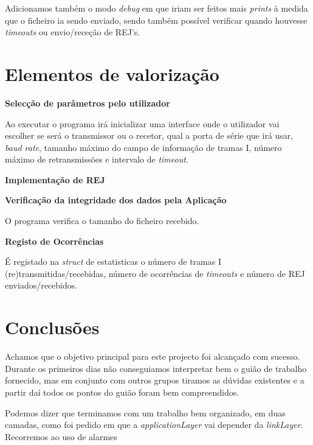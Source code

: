 \documentclass[11pt]{article}
\begin{document}
\par Adicionamos também o modo \textit{debug} em que iriam ser feitos mais \textit{prints} à medida que o ficheiro ia sendo enviado, sendo também possível verificar quando houvesse \textit{timeouts} ou envio/receção de REJ's. 






\newpage
\section{ Elementos de valorização}

\textbf{Selecção de parâmetros pelo utilizador}
\par Ao executar o programa irá inicializar uma interface onde o utilizador vai escolher se será o transmissor ou o recetor, qual a porta de série que irá usar, \textit{baud rate}, tamanho máximo do campo de informação de tramas I, número máximo de retransmissões e intervalo de \textit{timeout}.\newline

\textbf{Implementação de REJ}
\small
{}

\normalsize

\textbf{Verificação da integridade dos dados pela Aplicação}
\par O programa verifica o tamanho do ficheiro recebido.\newline
\par\textbf{Registo de Ocorrências}
\par É registado na \textit{struct} de estatisticas o número de tramas I (re)transmitidas/recebidas, número de ocorrências de \textit{timeouts} e número de REJ enviados/recebidos.



\newpage
\section{Conclusões}
Achamos que o objetivo principal para este projecto foi alcançado com sucesso. Durante os primeiros dias não conseguiamos interpretar bem o guião de trabalho fornecido, mas em conjunto com outros grupos tiramos as dúvidas existentes e a partir daí todos os pontos do guião foram bem compreendidos. 

Podemos dizer que terminamos com um trabalho bem organizado, em duas camadas, como foi pedido em que a \textit{applicationLayer} vai depender da \textit{linkLayer}. Recorremos ao uso de alarmes 
\end{document}
